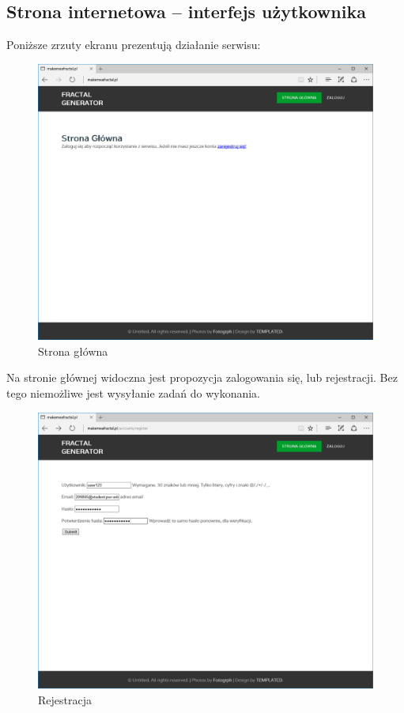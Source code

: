 \documentclass[a4paper]{article}
\begin{document}
\subsection{Strona internetowa -- interfejs użytkownika}
Poniższe zrzuty ekranu prezentują działanie serwisu:
 \begin{figure}[H]
    \centering
    \includegraphics[width=\textwidth]{main_page.png}
    \caption{Strona główna}
    \label{fig:main_page}
\end{figure}
Na stronie głównej widoczna jest propozycja zalogowania się, lub rejestracji. Bez tego niemożliwe jest wysyłanie zadań do wykonania. 
\begin{figure}[H]
    \centering
    \includegraphics[width=\textwidth]{register_page.png}
    \caption{Rejestracja}
    \label{fig:reg_page}
\end{figure}
\end{document}

